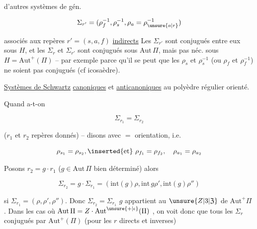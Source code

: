 
d'autres systèmes de gén.

\[
\Sigma_{r'}=(\rho_f^{-1},\rho_s^{-1},\rho_a=\rho_{\unsure{a|r}}^{-1})
\]

associés aux repères $r'=(s,a,f)$ \uline{indirects}
Les $\Sigma_{r'}$ sont conjugués entre eux sous $H$, et les $\Sigma_r$ et $\Sigma_{r'}$ sont conjugués sous $\mathrm{Aut}\,\Pi$, mais pas néc. sous $H=\mathrm{Aut}^{+}(\Pi)$ -- par exemple parce qu'il se peut que les $\rho_s$ et $\rho_s^{-1}$ (ou $\rho_f$ et $\rho_f^{-1}$) ne soient pas conjugués (cf icosaèdre).

\uline{Systèmes de Schwartz} \uline{canoniques} et \uline{anticanoniques}  au polyèdre régulier orienté.

Quand a-t-on

\[
\Sigma_{r_1}=\Sigma_{r_2}
\]

($r_1$ et $r_2$  repères donnés) -- disons avec $=$ orientation, i.e.

\[
\rho_{s_1}=\rho_{s_2},\inserted{\text{et}}\ \rho_{f_1}=\rho_{f_2},\quad \rho_{a_1}=\rho_{a_2}
\]

 Posons $r_2=g\cdot r_1$ ($g\in\mathrm{Aut}\,\Pi$ bien déterminé) alors

\[
\Sigma_{r_2}=g\cdot\Sigma_{r_1}=
(\mathrm{int}(g)\rho,\mathrm{int}\,g\rho',\mathrm{int}(g)\rho'')
\]

si $\Sigma_{r_1}=(\rho,\rho',\rho'')$. Donc $\Sigma_{r_2}=\Sigma_{r_1}$  $g$ appartient au   $\unsure{Z|3|\mathfrak Z}$ de $\mathrm{Aut}^{+}\Pi$ . Dans les cas où $\mathrm{Aut}\,\Pi=Z\cdot\mathrm{Aut}^{\unsure{+|\epsilon}}(\Pi)$ , on voit donc que  tous les $\Sigma_r$ conjugués par $\mathrm{Aut}^{+}(\Pi)$ (pour les $r$ directs et inverses)

